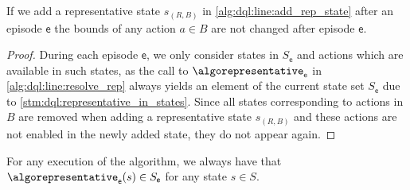 \documentclass{theoretics}
\newcommand{\States}{S}
\newcommand{\algoepisode}{\mathsf{e}}
\begin{document}
\begin{lemma} \label{stm:dql:collapsed_states_unchanged}
	If we add a representative state $s_{(R, B)}$ in \cref{alg:dql:line:add_rep_state} after an episode $\algoepisode$ the bounds of any action $a \in B$ are not changed after episode $\algoepisode$.
\end{lemma}

\begin{proof}
	During each episode $\algoepisode$, we only consider states in $\States_\algoepisode$ and actions which are available in such states, as the call to $\algorepresentative_\algoepisode$ in \cref{alg:dql:line:resolve_rep} always yields an element of the current state set $\States_\algoepisode$ due to \cref{stm:dql:representative_in_states}.
	Since all states corresponding to actions in $B$ are removed when adding a representative state $s_{(R, B)}$ and these actions are not enabled in the newly added state, they do not appear again. 
\end{proof}

\begin{lemma} \label{stm:dql:representative_in_states}
	For any execution of the algorithm, we always have that $\algorepresentative_\algoepisode(s) \in \States_\algoepisode$ for any state $s \in \States$.
\end{lemma}
\end{document}
